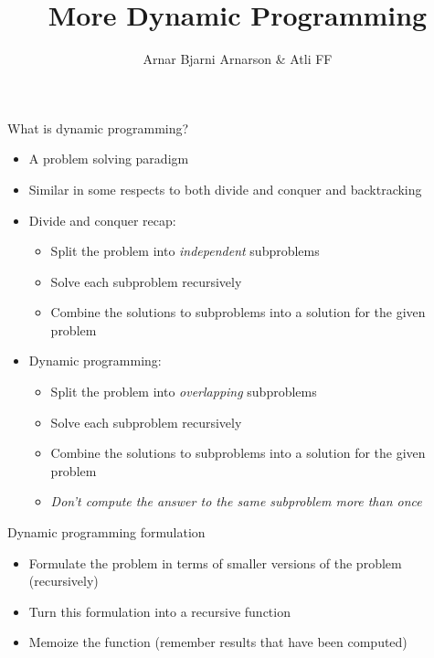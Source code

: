\documentclass{beamer}
\title{More Dynamic Programming}
\author{Arnar Bjarni Arnarson \& Atli FF}
\institute{\href{http://ru.is/td}{School of Computer Science} \\[2pt] \href{http://ru.is}{Reykjavík University}}
\begin{document}
\maketitle

\begin{frame}[plain]{What is dynamic programming?}
    \begin{itemize}
        \item A problem solving paradigm
        \item Similar in some respects to both divide and conquer and backtracking
        \vspace{5pt}
        \item Divide and conquer recap:
        \begin{itemize}
            \item Split the problem into \textit{independent} subproblems
            \item Solve each subproblem recursively
            \item Combine the solutions to subproblems into a solution for the given problem
        \end{itemize}
        \vspace{5pt}
        \item Dynamic programming:
        \begin{itemize}
            \item Split the problem into \textit{overlapping} subproblems
            \item Solve each subproblem recursively
            \item Combine the solutions to subproblems into a solution for the given problem
            \item \textit{Don't compute the answer to the same subproblem more than once}
        \end{itemize}
    \end{itemize}
\end{frame}

\begin{frame}{Dynamic programming formulation}
    \vspace{30pt}
    \begin{itemize}
        \item Formulate the problem in terms of smaller versions of the problem (recursively)
        \item Turn this formulation into a recursive function
        \item Memoize the function (remember results that have been computed)
    \end{itemize}
\end{frame}
\end{document}
